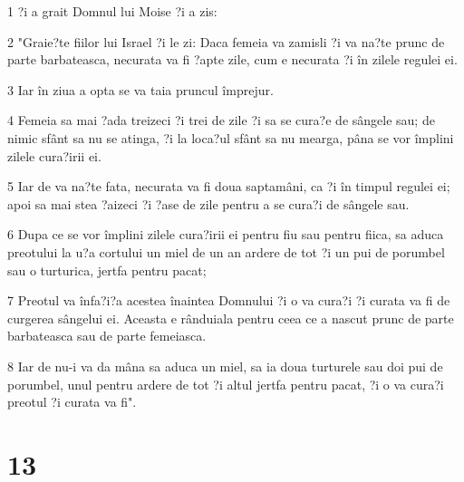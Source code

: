 \par 1 ?i a grait Domnul lui Moise ?i a zis:
\par 2 "Graie?te fiilor lui Israel ?i le zi: Daca femeia va zamisli ?i va na?te prunc de parte barbateasca, necurata va fi ?apte zile, cum e necurata ?i în zilele regulei ei.
\par 3 Iar în ziua a opta se va taia pruncul împrejur.
\par 4 Femeia sa mai ?ada treizeci ?i trei de zile ?i sa se cura?e de sângele sau; de nimic sfânt sa nu se atinga, ?i la loca?ul sfânt sa nu mearga, pâna se vor împlini zilele cura?irii ei.
\par 5 Iar de va na?te fata, necurata va fi doua saptamâni, ca ?i în timpul regulei ei; apoi sa mai stea ?aizeci ?i ?ase de zile pentru a se cura?i de sângele sau.
\par 6 Dupa ce se vor împlini zilele cura?irii ei pentru fiu sau pentru fiica, sa aduca preotului la u?a cortului un miel de un an ardere de tot ?i un pui de porumbel sau o turturica, jertfa pentru pacat;
\par 7 Preotul va înfa?i?a acestea înaintea Domnului ?i o va cura?i ?i curata va fi de curgerea sângelui ei. Aceasta e rânduiala pentru ceea ce a nascut prunc de parte barbateasca sau de parte femeiasca.
\par 8 Iar de nu-i va da mâna sa aduca un miel, sa ia doua turturele sau doi pui de porumbel, unul pentru ardere de tot ?i altul jertfa pentru pacat, ?i o va cura?i preotul ?i curata va fi".

\chapter{13}

